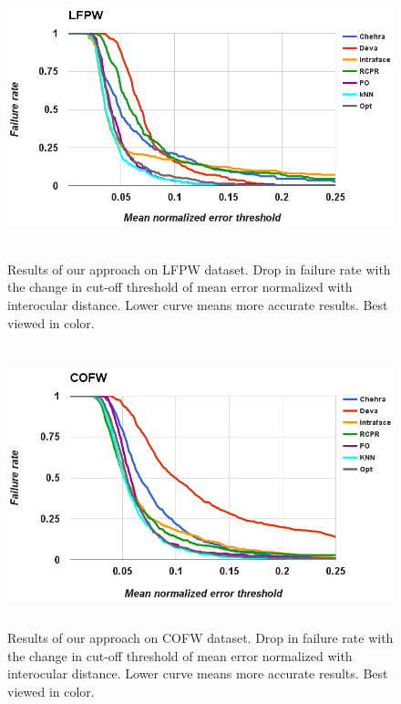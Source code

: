 \begin{figure}[!ht]
  \centering
  \includegraphics[width=5.6in,height=3.2in]{fid/figures/lfpw_failure_rate_graph.png}
  \caption{Results of our approach on LFPW dataset.
  Drop in failure rate with the change in cut-off threshold of mean error normalized 
  with interocular distance. Lower curve means more accurate results. Best viewed in color.}
  \label{fig:graph_results}
\end{figure}

\begin{figure}[!ht]
  \centering
  \includegraphics[width=5.6in,height=3.2in]{fid/figures/cofw_failure_rate_graph.png}
  \caption{Results of our approach on COFW dataset.
  Drop in failure rate with the change in cut-off threshold of mean error normalized 
  with interocular distance. Lower curve means more accurate results. Best viewed in color.}
  \label{fig:graph_results}
\end{figure}

